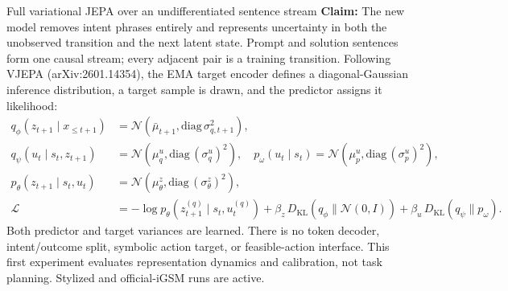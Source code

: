 \documentclass[aspectratio=169,10pt]{beamer}
\newcommand{\claim}[1]{\textcolor{cviolet}{\textbf{Claim:} #1}}
\begin{document}
\begin{frame}{Full variational JEPA over an undifferentiated sentence stream}
\claim{The new model removes intent phrases entirely and represents uncertainty
in both the unobserved transition and the next latent state.}
\small
Prompt and solution sentences form one causal stream; every adjacent pair is a
training transition. Following VJEPA (arXiv:2601.14354), the EMA target encoder
defines a diagonal-Gaussian inference distribution, a target sample is drawn,
and the predictor assigns it likelihood:
\begin{align*}
q_\phi(z_{t+1}\mid x_{\le t+1})&=\mathcal N(\bar\mu_{t+1},
  \mathrm{diag}\,\sigma^2_{q,t+1}),\\
q_\psi(u_t\mid s_t,z_{t+1})&=\mathcal N(\mu^u_q,
  \mathrm{diag}\,(\sigma^u_q)^2),\quad
p_\omega(u_t\mid s_t)=\mathcal N(\mu^u_p,\mathrm{diag}\,(\sigma^u_p)^2),\\
p_\theta(z_{t+1}\mid s_t,u_t)&=\mathcal N(\mu^z_\theta,
  \mathrm{diag}\,(\sigma^z_\theta)^2),\\
\mathcal L&=-\log p_\theta(z_{t+1}^{(q)}\mid s_t,u_t^{(q)})
 +\beta_z\,D_{\mathrm{KL}}(q_\phi\|\mathcal N(0,I))
 +\beta_u\,D_{\mathrm{KL}}(q_\psi\|p_\omega).
\end{align*}
Both predictor and target variances are learned. There is no token decoder,
intent/outcome split, symbolic action target, or feasible-action interface.
This first experiment evaluates representation dynamics and calibration, not
task planning. Stylized and official-iGSM runs are active.
\end{frame}
\end{document}
